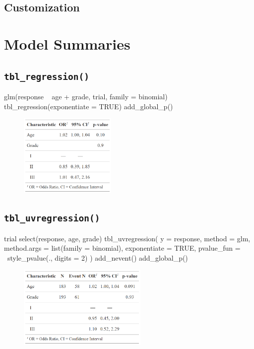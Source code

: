 \subsection{Customization}



\section{Model Summaries}

\subsection{\texorpdfstring{\texttt{tbl\_regression()}}{tbl\_regression()}}

\begin{example}
glm(response ~ age + grade, trial, family = binomial) %
  tbl_regression(exponentiate = TRUE) %
  add_global_p()
\end{example}

\begin{figure}[h!]
  \includegraphics[height=4cm]{regression.png}
  \centering
\end{figure}

\subsection{\texorpdfstring{\texttt{tbl\_uvregression()}}{tbl\_uvregression()}}
\begin{example}
trial %
  select(response, age, grade) %
  tbl_uvregression(
    y = response, 
    method = glm,
    method.args = list(family = binomial),
    exponentiate = TRUE,
    pvalue_fun = ~style_pvalue(., digits = 2)
  ) %
  add_nevent() %
  add_global_p()
\end{example}

\begin{figure}[h!]
  \includegraphics[height=4cm]{uvregression.png}
  \centering
\end{figure}


